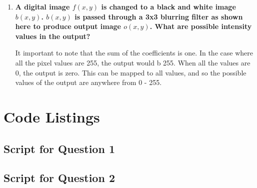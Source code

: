 \begin{enumerate}[font=\bfseries]
    \item \textbf{A digital image $f(x,y)$ is  changed to a  black and white
    image $b(x,y)$.  $b(x,y)$ is passed through a 3x3 blurring filter as shown
    here to produce output image $o(x,y)$. What are possible intensity values in
    the output?}

    It important to note that the sum of the coefficients is one. In the case
    where all the pixel values are 255, the output would b 255. When all the
    values are 0, the output is zero. This can be mapped to all values, and so
    the possible values of the output are anywhere from 0 - 255.

\end{enumerate}

\pagebreak

\appendix

\section{Code Listings}

\subsection{Script for Question 1}



\pagebreak

\subsection{Script for Question 2}


